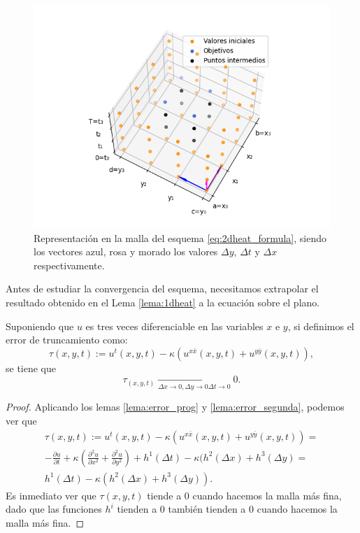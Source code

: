 \begin{figure}
	\centering
	\includegraphics[scale=0.7]{./Imagenes/Bitmap/2dheatpoints.png}
	\caption{Representación en la malla del esquema \eqref{eq:2dheat_formula}, siendo los vectores azul, rosa y morado los valores $\Delta y$, $\Delta t$ y $\Delta x$ respectivamente. }
	\label{fig:2dheatpoints}
\end{figure}

Antes de estudiar la convergencia del esquema, necesitamos extrapolar el resultado obtenido en el Lema \ref{lema:1dheat} a la ecuación sobre el plano.

\begin{lema}
		Suponiendo que $u$ es tres veces diferenciable en las variables $x$ e $y$, si definimos el error de truncamiento como:
	\begin{equation}
		\label{eq:lema2_eq1}
		\tau(x,y,t) := u^t(x,y,t)-\kappa \left(u^{x\bar{x}}(x,y,t) + u^{y\bar{y}}(x,y,t)\right),
	\end{equation}
	se tiene que
	\begin{equation}
		\tau_(x,y,t) \xrightarrow[\Delta x \rightarrow 0, \Delta y\rightarrow 0 \Delta t\rightarrow 0]{} 0.
	\end{equation}
\end{lema}

\begin{proof}
	Aplicando los lemas \ref{lema:error_prog} y \ref{lema:error_segunda}, podemos ver que
	\begin{multline}
		\tau(x,y,t) := u^t(x,y,t)-\kappa \left(u^{x\bar{x}}(x,y,t) + u^{y\bar{y}}(x,y,t)\right) = \\
		-\frac{\partial u}{\partial t} + \kappa\left( \frac{\partial^2u}{\partial x^2} + \frac{\partial^2u}{\partial y^2}\right) + h^1(\Delta t) - \kappa(h^2(\Delta x) + h^3(\Delta y)  = \\ h^1(\Delta t) - \kappa(h^2(\Delta x) + h^3(\Delta y)).	
	\end{multline}
	Es inmediato ver que $\tau(x,y,t)$ tiende a 0 cuando hacemos la malla más fina, dado que las funciones $h^i$ tienden a 0 también tienden a 0 cuando hacemos la malla más fina.
\end{proof}

